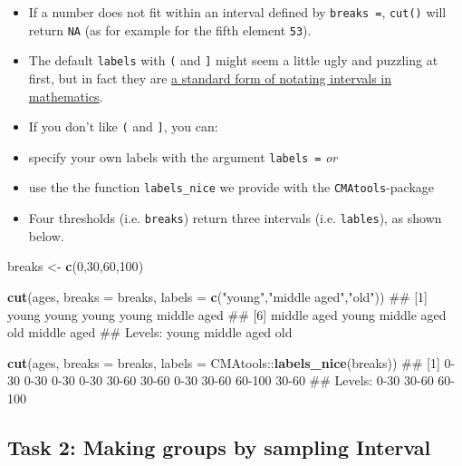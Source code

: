 \documentclass[]{book}
\newenvironment{Shaded}{\begin{snugshade}}{\end{snugshade}}
\newcommand{\KeywordTok}[1]{\textcolor[rgb]{0.13,0.29,0.53}{\textbf{{#1}}}}
\newcommand{\DataTypeTok}[1]{\textcolor[rgb]{0.13,0.29,0.53}{{#1}}}
\newcommand{\DecValTok}[1]{\textcolor[rgb]{0.00,0.00,0.81}{{#1}}}
\newcommand{\StringTok}[1]{\textcolor[rgb]{0.31,0.60,0.02}{{#1}}}
\newcommand{\NormalTok}[1]{{#1}}
\providecommand{\tightlist}{%
  \setlength{\itemsep}{0pt}\setlength{\parskip}{0pt}}
\theoremstyle{definition}
\theoremstyle{definition}
\theoremstyle{definition}
\theoremstyle{remark}
\begin{document}
\begin{itemize}
\tightlist
\item
  If a number does not fit within an interval defined by
  \texttt{breaks\ =}, \texttt{cut()} will return \texttt{NA} (as for
  example for the fifth element \texttt{53}).
\item
  The default \texttt{labels} with \texttt{(} and \texttt{{]}} might
  seem a little ugly and puzzling at first, but in fact they are
  \href{https://en.wikipedia.org/wiki/Interval_\%28mathematics\%29\#Notations_for_intervals}{a
  standard form of notating intervals in mathematics}.
\item
  If you don't like \texttt{(} and \texttt{{]}}, you can:
\item
  specify your own labels with the argument \texttt{labels\ =} \emph{or}
\item
  use the the function \texttt{labels\_nice} we provide with the
  \texttt{CMAtools}-package
\item
  Four thresholds (i.e. \texttt{breaks}) return three intervals (i.e.
  \texttt{lables}), as shown below.
\end{itemize}

\begin{Shaded}
\begin{Highlighting}[]

\NormalTok{breaks <-}\StringTok{ }\KeywordTok{c}\NormalTok{(}\DecValTok{0}\NormalTok{,}\DecValTok{30}\NormalTok{,}\DecValTok{60}\NormalTok{,}\DecValTok{100}\NormalTok{)}

\KeywordTok{cut}\NormalTok{(ages, }\DataTypeTok{breaks =} \NormalTok{breaks, }\DataTypeTok{labels =} \KeywordTok{c}\NormalTok{(}\StringTok{"young"}\NormalTok{,}\StringTok{"middle aged"}\NormalTok{,}\StringTok{"old"}\NormalTok{))}
\NormalTok{##  [1] young       young       young       young       middle aged}
\NormalTok{##  [6] middle aged young       middle aged old         middle aged}
\NormalTok{## Levels: young middle aged old}

\KeywordTok{cut}\NormalTok{(ages, }\DataTypeTok{breaks =} \NormalTok{breaks, }\DataTypeTok{labels =} \NormalTok{CMAtools::}\KeywordTok{labels_nice}\NormalTok{(breaks))}
\NormalTok{##  [1] 0-30   0-30   0-30   0-30   30-60  30-60  0-30   30-60  60-100 30-60 }
\NormalTok{## Levels: 0-30 30-60 60-100}
\end{Highlighting}
\end{Shaded}

\subsection{Task 2: Making groups by sampling
Interval}\label{task-2-making-groups-by-sampling-interval}
\end{document}
